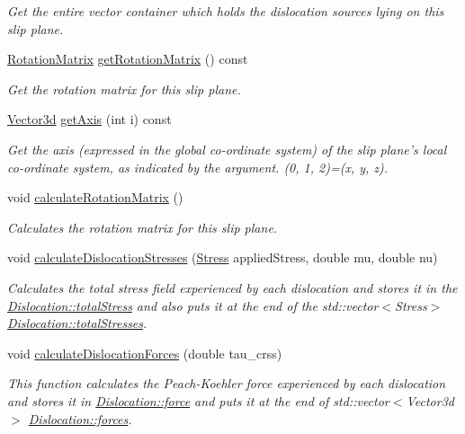 \begin{DoxyCompactItemize}
\begin{DoxyCompactList}\small\item\em \-Get the entire vector container which holds the dislocation sources lying on this slip plane. \end{DoxyCompactList}\item 
\hyperlink{classRotationMatrix}{\-Rotation\-Matrix} \hyperlink{classSlipPlane_a774507778626c6a0fd72722c6781b652}{get\-Rotation\-Matrix} () const 
\begin{DoxyCompactList}\small\item\em \-Get the rotation matrix for this slip plane. \end{DoxyCompactList}\item 
\hyperlink{classVector3d}{\-Vector3d} \hyperlink{classSlipPlane_a83806b1e34cf044005d34920903e7074}{get\-Axis} (int i) const 
\begin{DoxyCompactList}\small\item\em \-Get the axis (expressed in the global co-\/ordinate system) of the slip plane's local co-\/ordinate system, as indicated by the argument. (0, 1, 2)=(x, y, z). \end{DoxyCompactList}\item 
void \hyperlink{classSlipPlane_a5d9054f21be225f50860ad1351e3a86f}{calculate\-Rotation\-Matrix} ()
\begin{DoxyCompactList}\small\item\em \-Calculates the rotation matrix for this slip plane. \end{DoxyCompactList}\item 
void \hyperlink{classSlipPlane_a2d4d2d031502d4a6f0aebbad0990b882}{calculate\-Dislocation\-Stresses} (\hyperlink{classStress}{\-Stress} applied\-Stress, double mu, double nu)
\begin{DoxyCompactList}\small\item\em \-Calculates the total stress field experienced by each dislocation and stores it in the \hyperlink{classDislocation_ae27176c0d47fec3e188d7caa4c52f366}{\-Dislocation\-::total\-Stress} and also puts it at the end of the std\-::vector$<$\-Stress$>$ \hyperlink{classDislocation_adb36ed6c1772f2614ffbed4dcc748c13}{\-Dislocation\-::total\-Stresses}. \end{DoxyCompactList}\item 
void \hyperlink{classSlipPlane_ac16d1abbbc3b938b6f1f29a33a70212d}{calculate\-Dislocation\-Forces} (double tau\-\_\-crss)
\begin{DoxyCompactList}\small\item\em \-This function calculates the \-Peach-\/\-Koehler force experienced by each dislocation and stores it in \hyperlink{classDislocation_a9c19c7493d896bd845c489e1ec3cbbb6}{\-Dislocation\-::force} and puts it at the end of std\-::vector$<$\-Vector3d$>$ \hyperlink{classDislocation_aa8f4567bbfc6a58aaad01d5c423658c1}{\-Dislocation\-::forces}. \end{DoxyCompactList}\item 

\end{DoxyCompactItemize}

